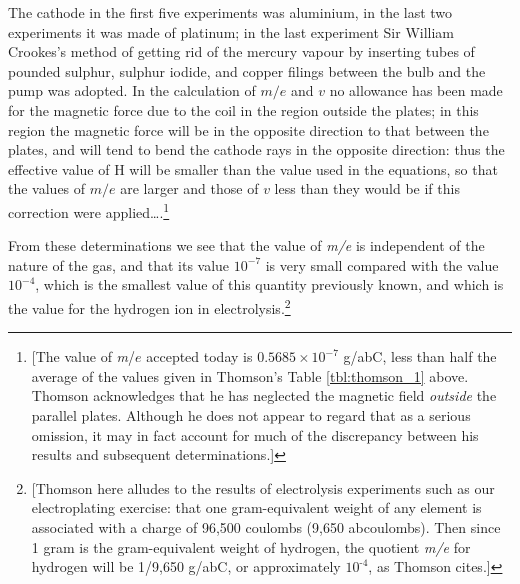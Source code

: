 The cathode in the first five experiments was aluminium, in the last two
experiments it was made of platinum; in the last experiment Sir William
Crookes's method of getting rid of the mercury vapour by inserting tubes
of pounded sulphur, sulphur iodide, and copper filings between the bulb
and the pump was adopted. In the calculation of $m/e$ and $v$
no allowance has been made for the magnetic force due to the coil in the
region outside the plates; in this region the magnetic force will be in
the opposite direction to that between the plates, and will tend to bend
the cathode rays in the opposite direction: thus the effective value of
H will be smaller than the value used in the equations, so that the
values of $m/e$ are larger and those of $v$ less than they
would be if this correction were applied\ldots.\footnote{{[}The value of
  \emph{m}/$e$ accepted today is $0.5685\!\times\!10^{-7}$ g/abC, less than
  half the average of the values given in Thomson's Table \ref{tbl:thomson_1} above. Thomson
  acknowledges that he has neglected the magnetic field \emph{outside}
  the parallel plates. Although he does not appear to regard that as a
  serious omission, it may in fact account for much of the discrepancy
  between his results and subsequent determinations.{]}}

From these determinations we see that the value of \emph{m/e} is
independent of the nature of the gas, and that its value $10^{-7}$ is very
small compared with the value $10^{-4}$, which is the smallest value of this
quantity previously known, and which is the value for the hydrogen ion
in electrolysis.\footnote{{[}Thomson here alludes to the results of
  electrolysis experiments such as our electroplating exercise: that one
  gram-equivalent weight of any element is associated with a charge of
  96,500 coulombs (9,650 abcoulombs). Then since 1 gram is the
  gram-equivalent weight of hydrogen, the quotient \emph{m/e} for
  hydrogen will be 1/9,650 g/abC, or approximately $10^{‑4}$, as Thomson
  cites.{]}}

